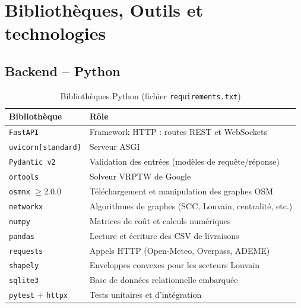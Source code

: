 \documentclass[a4paper, 12pt, twoside]{article}
\begin{document}
\section{Biblioth\`{e}ques, Outils et technologies}

\subsection{Backend -- Python}

\begin{table}[h]
  \begin{center}
    \begin{tabular}{|l|l|}
      \hline
      \textbf{Biblioth\`{e}que} & \textbf{R\^{o}le} \\
      \hline
      \texttt{FastAPI} & Framework HTTP : routes REST et WebSockets \\
      \texttt{uvicorn[standard]} & Serveur ASGI \\
      \texttt{Pydantic v2} & Validation des entr\'{e}es (mod\`{e}les de requ\^{e}te/r\'{e}ponse) \\
      \texttt{ortools} & Solveur VRPTW de Google \\
      \texttt{osmnx} $\geq$2.0.0 & T\'{e}l\'{e}chargement et manipulation des graphes OSM \\
      \texttt{networkx} & Algorithmes de graphes (SCC, Louvain, centralit\'{e}, etc.) \\
      \texttt{numpy} & Matrices de co\^{u}t et calculs num\'{e}riques \\
      \texttt{pandas} & Lecture et \'{e}criture des CSV de livraisons \\
      \texttt{requests} & Appels HTTP (Open-Meteo, Overpass, ADEME) \\
      \texttt{shapely} & Enveloppes convexes pour les secteurs Louvain \\
      \texttt{sqlite3} & Base de donn\'{e}es relationnelle embarqu\'{e}e \\
      \texttt{pytest} + \texttt{httpx} & Tests unitaires et d'int\'{e}gration \\
      \hline
    \end{tabular}
  \end{center}
  \caption{Biblioth\`{e}ques Python (fichier \texttt{requirements.txt})}
  \label{tab:python-libs}
\end{table}
\end{document}
